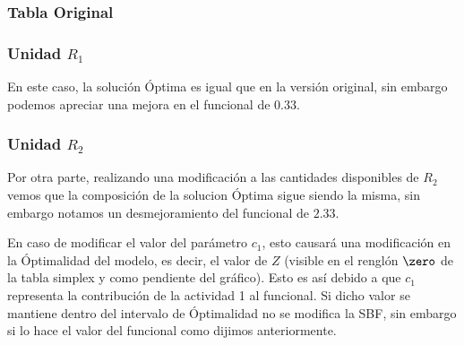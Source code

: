 

\begin{homeworkProblem}[-1][Modelo \RN{1}]
\subsubsection{Tabla Original}
\subsubsection{Unidad $R_1$}
En este caso, la solución Óptima es igual que en la versión original, sin embargo podemos apreciar una mejora en el funcional de $0.33$.
\subsubsection{Unidad $R_2$}
Por otra parte, realizando una modificación a las cantidades disponibles de $R_2$ vemos que la composición de la solucion Óptima sigue siendo la misma, sin embargo notamos un desmejoramiento del funcional de $2.33$. 
\end{homeworkProblem}

\begin{homeworkProblem}[-1][Modelo \RN{2}]
En caso de modificar el valor del parámetro $c_1$, esto causará una modificación en la Óptimalidad del modelo, es decir, el valor de $Z$ (visible en el renglón $\zero$ de la tabla simplex y como pendiente del gráfico).
Esto es así debido a que $c_1$ representa la contribución de la actividad 1 al funcional. Si dicho valor se mantiene dentro del intervalo de Óptimalidad no se modifica la SBF, sin embargo si lo hace el valor del funcional como dijimos anteriormente.
\end{homeworkProblem}

